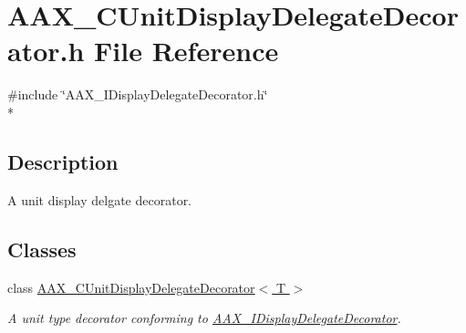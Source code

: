 \hypertarget{a00199}{}\section{A\+A\+X\+\_\+\+C\+Unit\+Display\+Delegate\+Decorator.\+h File Reference}
\label{a00199}
{\ttfamily \#include \char`\"{}A\+A\+X\+\_\+\+I\+Display\+Delegate\+Decorator.\+h\char`\"{}}\\*


\subsection{Description}
A unit display delgate decorator. 

\subsection*{Classes}
\begin{DoxyCompactItemize}
\item 
class \hyperlink{a00045}{A\+A\+X\+\_\+\+C\+Unit\+Display\+Delegate\+Decorator$<$ T $>$}
\begin{DoxyCompactList}\small\item\em A unit type decorator conforming to \hyperlink{a00094}{A\+A\+X\+\_\+\+I\+Display\+Delegate\+Decorator}. \end{DoxyCompactList}\end{DoxyCompactItemize}
